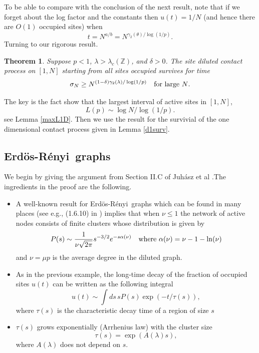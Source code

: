 \documentclass[11pt]{article}
\newtheorem{theorem}{Theorem}
\theoremstyle{definition}
\def\beq{ \begin{equation} }
\def\eeq{ \end{equation} }
\def\ZZ{\mathbb{Z}}
\def\ER{Erd\"os-R\'enyi\ }
\begin{document}
\medskip
To be able to compare with the conclusion of the next result, note that if we forget about the log factor and the constants then $u(t) = 1/N$ (and hence there are $O(1)$ occupied sites) when 
\beq
t = N^{a/b} = N^{\gamma_2(\theta)/\log(1/p)}.
\label{translate}
\eeq
Turning to our rigorous result. 


\begin{theorem} \label{Gphase}
Suppose $p<1$, $\lambda>\lambda_c(\ZZ)$, and $\delta>0$. The site diluted contact process on $[1,N]$ starting from all sites occupied survives for time 
\beq
\sigma_N \ge N^{(1-\delta) \gamma_2(\lambda)/\log(1/p)}
\quad\hbox{for large $N$}.
\label{lb1D}
\eeq
\end{theorem}

\noindent
The key is the fact  show that the largest interval of active sites in $[1,N]$,
$$
L(p) \sim \log N/\log (1/p).
$$ 
see Lemma \ref{maxL1D}.
Then we use the result for the survivial of the one dimensional contact process given in Lemma \ref{d1surv}.




\subsection{\ER graphs}

 We begin by giving the argument from Section II.C of Juh\'asz et al \cite{JOCM}.The ingredients in the proof are the following. 

\begin{itemize}

\item
A well-known result  for \ER graphs which can be found in many places  (see e.g., (1.6.10) in \cite{DoG}) implies that when $\nu \le 1$ the network of active nodes consists of finite clusters whose distribution is given by
\beq
P(s) \sim \frac{1}{\nu \sqrt{2\pi}} s^{-3/2} e^{-s\alpha(\nu)}
\quad\hbox{where $\alpha(\nu) = \nu-1-\ln(\nu)$}
\label{Pofs}
\eeq
and $\nu = \mu p$ is the average degree in the diluted graph.

\item
As in the previous example, the long-time decay of the fraction of occupied sites $u(t)$ can be written as the following integral
\beq
u(t) \sim \int ds \, s P(s) \exp(-t/\tau(s)),
\label{rhot}
\eeq
where $\tau(s)$ is the characteristic decay time of a region of size $s$

\item
$\tau(s)$ grows exponentially (Arrhenius law) with the cluster size 
\beq
\tau(s) = \exp(A(\lambda)s),
\label{taus} 
\eeq
where  $A(\lambda)$ does not depend on $s$.

\end{itemize} 
\end{document}
